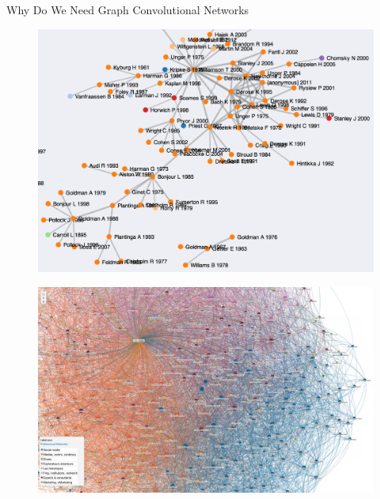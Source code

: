 \documentclass{beamer}
\begin{document}
\begin{frame}{Why Do We Need Graph Convolutional Networks}
\begin{minipage}[t]{.2\textwidth}
\begin{figure}[ht]
      \label{fig:internet}
    \end{figure}
  \end{minipage}
  \begin{minipage}[t]{.3\textwidth}
    \begin{figure}[ht]
      \centering
      \includegraphics[width=1.0\textwidth]{img/citation_network}
      \label{fig:citation}
    \end{figure}
  \end{minipage}
  \begin{minipage}[t]{.4\textwidth}
    \begin{figure}[ht]
      \centering
      \includegraphics[width=1.0\textwidth]{img/linkedin}
      \label{fig:linkedin}
    \end{figure}
  \end{minipage}
\end{frame}
\end{document}
